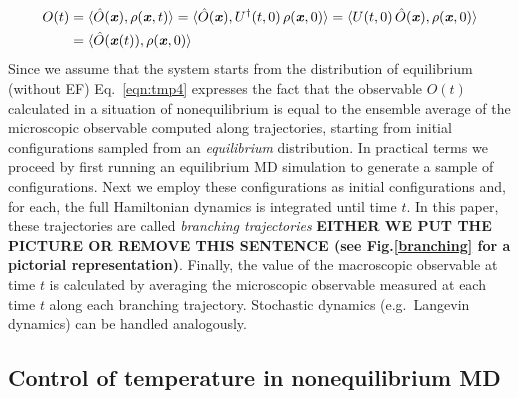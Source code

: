 \documentclass[a4paper,preprint,unsortedaddress,onecolumn]{revtex4-1}
\newcommand{\vect}[1]{\textbf{\textit{#1}}}
\begin{document}
\begin{align}\nonumber
  O(t) & = \langle \hat O(\vect x), \rho(\vect x, t)\rangle
  = \langle \hat O(\vect x), U^\dagger(t,0)\, \rho(\vect x, 0)\rangle
  = \langle U(t,0)\,\hat O(\vect x), \rho(\vect x, 0)\rangle\\\label{eqn:tmp4}
  &= \langle \hat O(\vect x(t)), \rho(\vect x, 0)\rangle
\end{align}
Since we assume that the system starts from the distribution of equilibrium (without EF)
 Eq.~\eqref{eqn:tmp4} expresses the fact that the 
observable $O(t)$ calculated in a situation of nonequilibrium is equal to the ensemble average of
the microscopic observable computed along trajectories, starting from
initial configurations sampled from an \emph{equilibrium}
distribution. In practical terms we proceed by first running an equilibrium MD simulation
to generate a sample of configurations. Next we employ these configurations as
initial configurations and, for each, the full Hamiltonian dynamics is integrated until
time $t$.
In this paper, these trajectories are called \emph{branching
  trajectories} {\bf EITHER WE PUT THE PICTURE OR REMOVE THIS SENTENCE {(see Fig.\ref{branching} for a pictorial representation)}}. 
Finally, the value of the macroscopic observable at time $t$ is
calculated by averaging the microscopic observable measured at each time $t$ along each branching trajectory.
Stochastic dynamics (e.g.~Langevin dynamics) can be handled analogously.




\subsection{Control of temperature in nonequilibrium MD}\label{sec:tmp2b}
\end{document}
